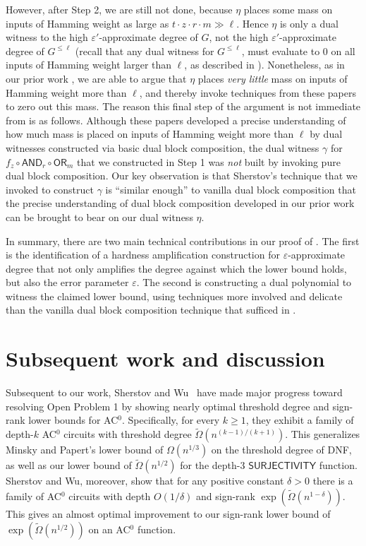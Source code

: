 \documentclass{toc}
\newcommand{\OR}{\mathsf{ OR}}
\newcommand{\eps}{\varepsilon}
\newcommand{\AND}{\mathsf{AND}}
\begin{document}
However, after Step 2, we are still not done, because $\eta$ places some mass on
inputs of Hamming weight as large as $t \cdot z \cdot r \cdot m \gg \ell$. Hence $\eta$ is only a dual
witness to the high $\eps'$-approximate degree of $G$, not the high $\eps'$-approximate degree of $G^{\leq \ell}$ (recall that any
dual witness %
for $G^{\leq \ell}$, must evaluate to 0 on all inputs of Hamming weight larger than $\ell$, %
as described in %
). 
Nonetheless, as in our prior work \cite{adegsurj, bkt}, we are able to argue that $\eta$ places \emph{very little} mass on inputs of Hamming weight more than
$\ell$, and thereby invoke techniques from %
these papers %
to zero out this mass. 
The reason this final step of the argument is not immediate
from %
\cite{adegsurj, bkt} is as follows. Although %
these papers %
developed
a precise understanding of how much mass is placed on inputs of Hamming weight
more than $\ell$ by dual witnesses constructed via basic dual block composition, 
the dual witness $\gamma$ for $f_z \circ \AND_r \circ \OR_{m}$ that we constructed in Step 1 
was \emph{not} built by invoking pure dual block composition. Our key observation is that Sherstov's technique that
we invoked to construct $\gamma$ is ``similar enough'' to vanilla dual block composition that the precise understanding
of dual block composition developed in our prior work can be brought to bear on our dual witness $\eta$.

In summary, there are two main technical contributions in our proof of . The first is the identification
of a hardness amplification construction for $\eps$-approximate degree that not only amplifies the degree against
which the lower bound holds, but also the error parameter $\eps$. The second is constructing a dual polynomial
to witness the claimed lower bound, using techniques more involved and delicate than the vanilla dual block composition technique that
sufficed in %
\cite{adegsurj, bkt}.



\vspace{-2mm}
\section{Subsequent work and discussion}

Subsequent to our work, Sherstov and Wu~\cite{SherstovWu19} have made major progress toward resolving Open Problem 1 by showing nearly optimal threshold degree and sign-rank lower bounds for AC$^0$. Specifically, for every $k \ge 1$, they exhibit a family of depth-$k$ AC$^0$ circuits with threshold degree $\tilde{\Omega}(n^{(k-1)/(k+1)})$. This generalizes Minsky and Papert's lower bound of $\Omega(n^{1/3})$ on the threshold degree of DNF, as well as our lower bound of $\tilde{\Omega}(n^{1/2})$ for the depth-3 $\mathsf{SURJECTIVITY}$ function. Sherstov and Wu, moreover, show that for any positive constant $\delta > 0$ there is a family of AC$^0$ circuits with depth $O(1/\delta)$ and sign-rank $\exp\left(\tilde{\Omega}(n^{1-\delta})\right)$. This gives an almost optimal improvement to our sign-rank lower bound of $\exp\left(\tilde{\Omega}(n^{1/2})\right)$ on an AC$^0$ function.
\end{document}
